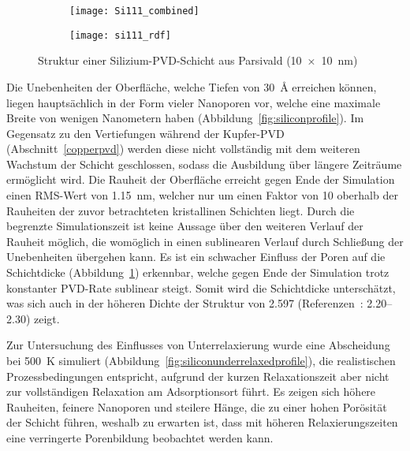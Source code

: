 \begin{figure}[t]
  \captionsetup[subfigure]{singlelinecheck=false}
  \def\subfigwidth{0.48\textwidth}
  \begin{subfigure}[t]{\subfigwidth}
    \texttt{[image: Si111\_combined]}
    \label{fig:siliconresults-a}
  \end{subfigure}
  \hfill
  \begin{subfigure}[t]{\subfigwidth}
    \texttt{[image: si111\_rdf]}
    \label{fig:siliconresults-b}
  \end{subfigure}
  \caption[Struktur einer Silizium-PVD-Schicht aus Parsivald]{
    Struktur einer Silizium-PVD-Schicht aus Parsivald (\SI{10x10}{\nano\meter})
  }
  \label{fig:siliconresults}
\end{figure}

Die Unebenheiten der Oberfläche, welche Tiefen von \SI{30}{\angstrom} erreichen können, liegen hauptsächlich in der Form vieler Nanoporen vor, welche eine maximale Breite von wenigen Nanometern haben (Abbildung~\ref{fig:siliconprofile}).
Im Gegensatz zu den Vertiefungen während der Kupfer-PVD (Abschnitt~\ref{copperpvd}) werden diese nicht vollständig mit dem weiteren Wachstum der Schicht geschlossen, sodass die Ausbildung über längere Zeiträume ermöglicht wird.
Die Rauheit der Oberfläche erreicht gegen Ende der Simulation einen RMS-Wert von \SI{1.15}{\nano\meter}, welcher nur um einen Faktor von \num{10} oberhalb der Rauheiten der zuvor betrachteten kristallinen Schichten liegt.
Durch die begrenzte Simulationszeit ist keine Aussage über den weiteren Verlauf der Rauheit möglich, die womöglich in einen sublinearen Verlauf durch Schließung der Unebenheiten übergehen kann.
Es ist ein schwacher Einfluss der Poren auf die Schichtdicke (Abbildung~\ref{fig:siliconresults-a}) erkennbar, welche gegen Ende der Simulation trotz konstanter PVD-Rate sublinear steigt.
Somit wird die Schichtdicke unterschätzt, was sich auch in der höheren Dichte der Struktur von \SI{2.597}{\gpcc} (Referenzen~\cite{remes_optical_1998,renner_density_1973}: \SIrange{2.20}{2.30}{\gpcc}) zeigt.

Zur Untersuchung des Einflusses von Unterrelaxierung wurde eine Abscheidung bei \SI{500}{\kelvin} simuliert (Abbildung~\ref{fig:siliconunderrelaxedprofile}), die realistischen Prozessbedingungen entspricht, aufgrund der kurzen Relaxationszeit aber nicht zur vollständigen Relaxation am Adsorptionsort führt.
Es zeigen sich höhere Rauheiten, feinere Nanoporen und steilere Hänge, die zu einer hohen Porösität der Schicht führen, weshalb zu erwarten ist, dass mit höheren Relaxierungszeiten eine verringerte Porenbildung beobachtet werden kann.

